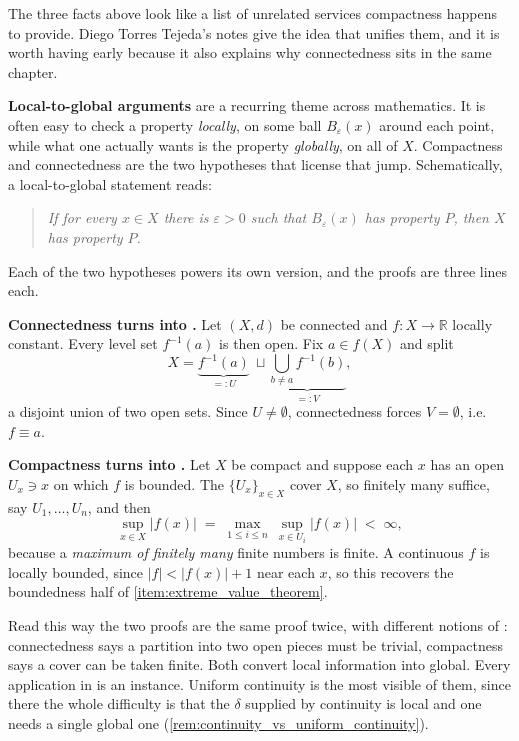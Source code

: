 \begin{remark}
\label{rem:local_to_global}
The three facts above look like a list of unrelated services compactness happens to provide.
Diego Torres Tejeda's notes give the idea that unifies them, and it is worth having early
because it also explains why connectedness sits in the same chapter.

\textbf{Local-to-global arguments} are a recurring theme across mathematics. It is often easy to
check a property \emph{locally}, on some ball $B_\varepsilon(x)$ around each point, while what one
actually wants is the property \emph{globally}, on all of $X$. Compactness and
connectedness are the two hypotheses that license that jump. Schematically, a local-to-global
statement reads:
\begin{quote}
\itshape
If for every $x \in X$ there is $\varepsilon>0$ such that $B_\varepsilon(x)$ has property $P$,
then $X$ has property $P$.
\end{quote}
Each of the two hypotheses powers its own version, and the proofs are three lines each.

\textbf{Connectedness turns  into .} Let $(X,d)$ be connected
and $f : X \to \mathbb{R}$ locally constant. Every level set $f^{-1}(a)$ is then open. Fix
$a \in f(X)$ and split
\[X = \underbrace{f^{-1}(a)}_{=:U} \ \sqcup \underbrace{\bigcup_{b \neq a}f^{-1}(b)}_{=:V},\]
a disjoint union of two open sets. Since $U \neq \emptyset$, connectedness forces $V=\emptyset$,
i.e.\ $f \equiv a$.

\textbf{Compactness turns  into .} Let $X$ be compact and
suppose each $x$ has an open $U_x \ni x$ on which $f$ is bounded. The $\{U_x\}_{x\in X}$ cover
$X$, so finitely many suffice, say $U_1,\dots,U_n$, and then
\[\sup_{x \in X}|f(x)| \;=\; \max_{1\leq i\leq n}\ \sup_{x \in U_i}|f(x)| \;<\; \infty,\]
because a \emph{maximum of finitely many} finite numbers is finite. A continuous $f$ is locally
bounded, since $|f|<|f(x)|+1$ near each $x$, so this recovers the boundedness half of
\cref{item:extreme_value_theorem}.

Read this way the two proofs are the same proof twice, with different notions of : connectedness says a partition into two open pieces must be trivial, compactness says a
cover can be taken finite. Both convert local information into global. Every application in
is an instance. Uniform continuity is the most visible of them, since there the whole difficulty
is that the $\delta$ supplied by continuity is local and one needs a single global one
(\cref{rem:continuity_vs_uniform_continuity}).
\end{remark}


